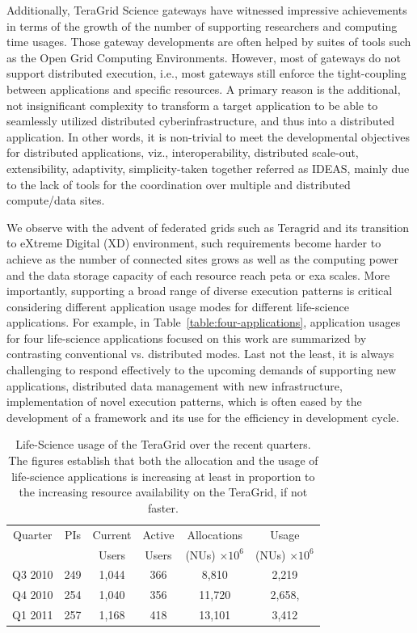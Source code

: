 \documentclass{sig-alternate}
\begin{document}
Additionally, TeraGrid Science gateways have witnessed
impressive achievements in terms of the growth of the number of
supporting researchers and computing time usages.  Those gateway developments are often helped by suites of tools such as the Open Grid Computing Environments\cite{ogce-2010}.  However, most of
gateways do not support distributed execution, i.e., most gateways
still enforce the tight-coupling between applications and specific
resources.  A primary reason is the additional, not insignificant
complexity to transform a target application to be able to seamlessly
utilized distributed cyberinfrastructure, and thus into a distributed
application.  In other words, it is non-trivial to meet the
developmental objectives for distributed applications, viz.,
interoperability, distributed scale-out, extensibility, adaptivity,
simplicity-taken together referred as IDEAS\cite{ideas}, mainly due to
the lack of tools for the coordination over multiple and distributed
compute/data sites.

We observe with the advent of federated grids such as Teragrid and its
transition to eXtreme Digital (XD) environment, such requirements
become harder to achieve as the number of connected sites grows as
well as the computing power and the data storage capacity of each
resource reach peta or exa scales.  More importantly, supporting a
broad range of diverse execution patterns is critical considering
different application usage modes for different life-science
applications.  For example, in Table~\ref{table:four-applications},
application usages for four life-science applications focused on this
work are summarized by contrasting conventional vs. distributed modes.
Last not the least, it is always challenging to respond effectively to
the upcoming demands of supporting new applications, distributed data
management with new infrastructure, implementation of novel execution
patterns, which is often eased by the development of a framework and
its use for the efficiency in development cycle.
 
\begin{table}
 \small
\begin{tabular}{|c|c|c|c|c|c|} 
  \hline  Quarter & PIs & Current & Active & Allocations  & Usage\\
  & & Users  &  Users & (NUs) $\times 10^6$& (NUs) $\times 10^6$ \\ \hline
  Q3 2010 & 249 & 1,044 & 366 & 8,810   & 2,219  \\ \hline
  Q4 2010 & 254 & 1,040 & 356 & 11,720  & 2,658, \\ \hline
  Q1 2011 & 257 & 1,168 & 418 & 13,101  & 3,412\\ \hline 
\end{tabular} 
\caption{Life-Science usage of the TeraGrid over the recent
  quarters. The figures establish that both the  allocation and the
  usage of life-science applications is increasing at least in
  proportion to the increasing resource availability on the TeraGrid,
  if not faster.}
 \label{tg2011} 
\end{table}
\end{document}
